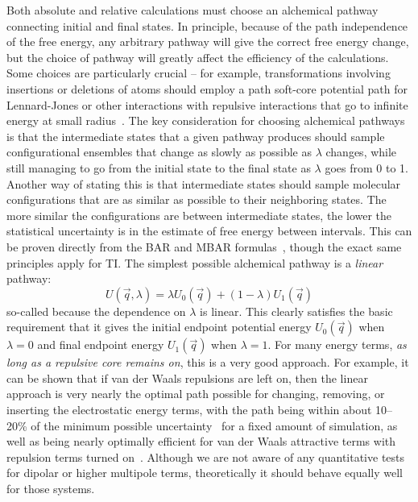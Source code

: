 \documentclass[9pt,bestpractices]{livecoms}
\begin{document}
%
Both absolute and relative calculations must choose an alchemical pathway connecting initial and final states. In principle, because of the path independence of the free energy, any arbitrary pathway will give the correct free energy change, but the choice of pathway will greatly affect the efficiency of the calculations. 
Some choices are particularly crucial -- for example, transformations involving insertions or deletions of atoms should employ a path soft-core potential path for Lennard-Jones or other interactions with repulsive interactions that go to infinite energy at small radius~\cite{}. 
%
The key consideration for choosing alchemical pathways is that the intermediate states that a given pathway produces should sample configurational ensembles that change as slowly as possible as $\lambda$ changes, while still managing to go from the initial state to the final state as $\lambda$ goes from 0 to 1.
%
Another way of stating this is that intermediate states should sample molecular configurations that are as similar as possible to their neighboring states. The more similar the configurations are between intermediate states, the lower the statistical uncertainty is in the estimate of free energy between intervals.  This can be proven directly from the BAR and MBAR formulas~\cite{bennett1976efficient,klimovich2015guidelines}, though the exact same principles apply for TI.
%
The simplest possible alchemical pathway is a \textit{linear} pathway:
%
\begin{equation}
U(\vec{q},\lambda) = \lambda U_0(\vec{q}) + (1-\lambda)U_1(\vec{q})    
\end{equation}
%
so-called because the dependence on $\lambda$ is linear. This clearly satisfies the basic requirement that it gives the initial endpoint potential energy $U_0(\vec{q})$ when $\lambda=0$ and final endpoint energy $U_1(\vec{q})$ when $\lambda=1$. 
%
For many energy terms, \textit{as long as a repulsive core remains on}, this is a very good approach.  For example, it can be shown that if van der Waals repulsions are left on, then the linear approach is very nearly the optimal path  possible for changing, removing, or inserting the electrostatic energy terms, with the path being within about 10--20\% of the minimum possible uncertainty~\cite{naden2015linear} for a fixed amount of simulation, as well as being nearly optimally efficient for van der Waals attractive terms with repulsion terms turned on~\cite{naden2014linear}. Although we are not aware of any quantitative tests for dipolar or higher multipole terms, theoretically it should behave equally well for those systems.
\end{document}
